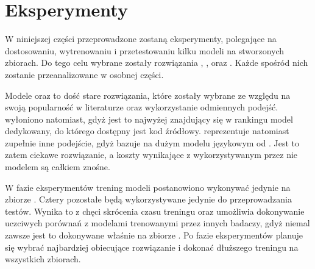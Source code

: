 \chapter{Eksperymenty}

W niniejszej części przeprowadzone zostaną eksperymenty, polegające na dostosowaniu, wytrenowaniu i przetestowaniu kilku modeli na stworzonych zbiorach. Do tego celu wybrane zostały rozwiązania , ,  oraz . Każde spośród nich zostanie przeanalizowane w osobnej części. 

Modele  oraz  to dość stare rozwiązania, które zostały wybrane ze względu na swoją popularność w literaturze oraz wykorzystanie odmiennych podejść.  wyłoniono natomiast, gdyż jest to najwyżej znajdujący się w rankingu  model dedykowany, do którego dostępny jest kod źródłowy.  reprezentuje natomiast zupełnie inne podejście, gdyż bazuje na dużym modelu językowym od . Jest to zatem ciekawe rozwiązanie, a koszty wynikające z wykorzystywanym przez nie modelem  są całkiem znośne.

W fazie eksperymentów trening modeli postanowiono wykonywać jedynie na zbiorze . Cztery pozostałe będą wykorzystywane jedynie do przeprowadzania testów. Wynika to z chęci skrócenia czasu treningu oraz umożliwia dokonywanie uczciwych porównań z modelami trenowanymi przez innych badaczy, gdyż niemal zawsze jest to dokonywane właśnie na zbiorze . Po fazie eksperymentów planuje się wybrać najbardziej obiecujące rozwiązanie i dokonać dłuższego treningu na wszystkich zbiorach.









